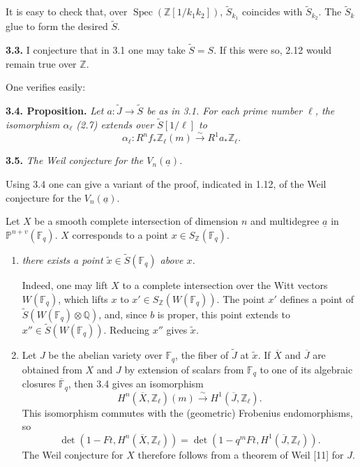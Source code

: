 \documentclass[10pt]{article}
\newcommand{\F}{\mathbb F}
\newcommand{\Pj}{\mathbb P}
\newcommand{\Q}{\mathbb Q}
\newcommand{\Z}{\mathbb Z}
\newcommand{\Spec}{\operatorname{Spec}}
\newcommand{\iso}{\xrightarrow{\sim}}
\newcommand{\sourcebreak}{\clearpage}
\begin{document}
It is easy to check that, over \(\Spec(\Z[1/k_1k_2])\), \(\widetilde S_{k_1}\) coincides with \(\widetilde S_{k_2}\). The \(\widetilde S_k\) glue to form the desired \(\widetilde S\).

\noindent\textbf{3.3.} I conjecture that in 3.1 one may take \(\widetilde S=S\). If this were so, 2.12 would remain true over \(\Z\).

\sourcebreak
One verifies easily:

\noindent\textbf{3.4. Proposition.} \emph{Let \(a:\widetilde J\longrightarrow\widetilde S\) be as in 3.1. For each prime number \(\ell\), the isomorphism \(\alpha_\ell\) (2.7) extends over \(\widetilde S[1/\ell]\) to}
\[
\alpha_\ell:R^nf_*\Z_\ell(m)\iso R^1a_*\Z_\ell.
\]

\noindent\textbf{3.5.} \emph{The Weil conjecture for the \(V_n(\underline a)\).}

Using 3.4 one can give a variant of the proof, indicated in 1.12, of the Weil conjecture for the \(V_n(\underline a)\).

Let \(X\) be a smooth complete intersection of dimension \(n\) and multidegree \(\underline a\) in \(\Pj^{n+v}(\F_q)\). \(X\) corresponds to a point \(x\in S_\Z(\F_q)\).

\begin{enumerate}[label=\alph*)]
\item \emph{there exists a point \(\widetilde x\in\widetilde S(\F_q)\) above \(x\).}

Indeed, one may lift \(X\) to a complete intersection over the Witt vectors \(W(\F_q)\), which lifts \(x\) to \(x'\in S_\Z(W(\F_q))\). The point \(x'\) defines a point of \(\widetilde S(W(\F_q)\otimes\Q)\), and, since \(b\) is proper, this point extends to \(x''\in\widetilde S(W(\F_q))\). Reducing \(x''\) gives \(\widetilde x\).

\item Let \(J\) be the abelian variety over \(\F_q\), the fiber of \(\widetilde J\) at \(\widetilde x\). If \(\overline X\) and \(\overline J\) are obtained from \(X\) and \(J\) by extension of scalars from \(\F_q\) to one of its algebraic closures \(\overline{\F}_q\), then 3.4 gives an isomorphism
\[
H^n(\overline X,\Z_\ell)(m)\iso H^1(\overline J,\Z_\ell).
\]
This isomorphism commutes with the (geometric) Frobenius endomorphisms, so
\[
\tag{3.5.1}
\det(1-Ft,H^n(\overline X,\Z_\ell))
=\det(1-q^mFt,H^1(\overline J,\Z_\ell)).
\]
The Weil conjecture for \(X\) therefore follows from a theorem of Weil [11] for \(J\).
\end{enumerate}
\end{document}
